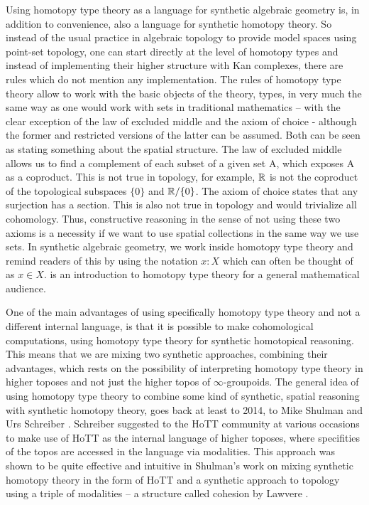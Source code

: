 Using homotopy type theory as a language for synthetic algebraic geometry is, in addition to convenience, also a language for synthetic homotopy theory.
So instead of the usual practice in algebraic topology to provide model spaces using point-set topology, one can start directly at the level of homotopy types and instead of implementing their higher structure with Kan complexes, there are rules which do not mention any implementation.
The rules of homotopy type theory allow to work with the basic objects of the theory, types, in very much the same way as one would work with sets in traditional mathematics -- with the clear exception of the law of excluded middle and the axiom of choice - although the former and restricted versions of the latter can be assumed.
Both can be seen as stating something about the spatial structure. The law of excluded middle allows us to find a complement of each subset of a given set A, which exposes A as a coproduct.
This is not true in topology, for example, $\mathbb{R}$ is not the coproduct of the topological subspaces $\{0\}$ and $\mathbb{R}/\{0\}$.
The axiom of choice states that any surjection has a section. This is also not true in topology and would trivialize all cohomology.
Thus, constructive reasoning in the sense of not using these two axioms is a necessity if we want to use spatial collections in the same way we use sets.
In synthetic algebraic geometry, we work inside homotopy type theory and remind readers of this by using the notation $x:X$ which can often be thought of as $x\in X$.
\cite{shulman-logic-of-spaces} is an introduction to homotopy type theory for a general mathematical audience.


One of the main advantages of using specifically homotopy type theory and not a different internal language,
is that it is possible to make cohomological computations, using homotopy type theory for synthetic homotopical reasoning.
This means that we are mixing two synthetic approaches, combining their advantages,
which rests on the possibility of interpreting homotopy type theory in higher toposes \cite{shulman2019all} and not just the higher topos of $\infty$-groupoids.
The general idea of using homotopy type theory to combine some kind of synthetic, spatial reasoning with synthetic homotopy theory, goes back at least to 2014, to Mike Shulman and Urs Schreiber \cite{Schreiber_2014}.
Schreiber suggested to the HoTT community at various occasions to make use of HoTT as the internal language of higher toposes, where specifities of the topos are accessed in the language via modalities.
This approach was shown to be quite effective and intuitive in Shulman's \cite{shulman-Brouwer-fixed-point} work on mixing synthetic homotopy theory in the form of HoTT and a synthetic approach to topology using a triple of modalities -- a structure called cohesion by Lawvere \cite{Lawvere2007}.

